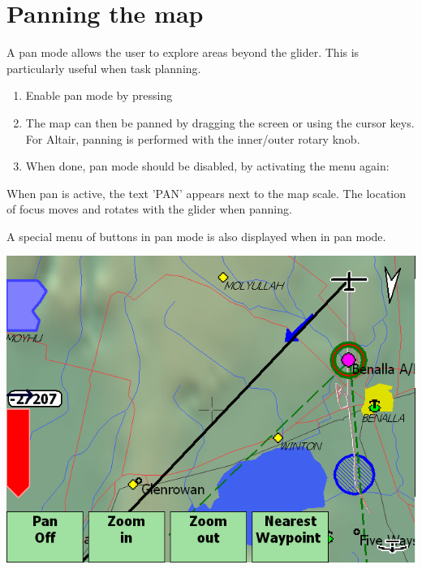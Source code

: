 \documentclass[a4paper,12pt]{refrep}
\begin{document}
%
%

\section{Panning the map}

A pan mode allows the user to explore areas beyond the glider.  This
is particularly useful when task planning.
\begin{enumerate}
\item Enable pan mode by pressing 
\begin{quote}
\blink{}
\end{quote}

\item The map can then be panned by dragging the screen or using the cursor
  keys.  For Altair, panning is performed with the inner/outer rotary knob.
\item When done, pan mode should be disabled, by activating the menu again:
\begin{quote}
\blink{}
\end{quote}

\end{enumerate} 

When pan is active, the text 'PAN' appears next to the map scale.  The
location of focus moves and rotates with the glider when panning.  

A special menu of buttons in pan mode is also displayed when in pan
mode.

\begin{center}
\includegraphics[angle=0,width=\linewidth,keepaspectratio='true']{figures/pan.png}
\end{center}
\end{document}
